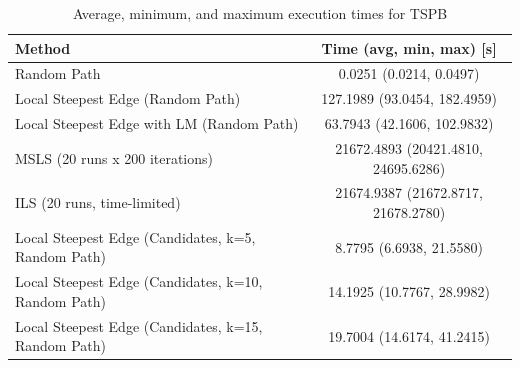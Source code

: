\begin{table}[h!]
\centering
\begin{tabular}{lc}
\hline
Method & Time (avg, min, max) [s] \\
\hline
Random Path & 0.0251 (0.0214, 0.0497) \\
Local Steepest Edge (Random Path) & 127.1989 (93.0454, 182.4959) \\
Local Steepest Edge with LM (Random Path) & 63.7943 (42.1606, 102.9832) \\
MSLS (20 runs x 200 iterations) & 21672.4893 (20421.4810, 24695.6286) \\
ILS (20 runs, time-limited) & 21674.9387 (21672.8717, 21678.2780) \\
Local Steepest Edge (Candidates, k=5, Random Path) & 8.7795 (6.6938, 21.5580) \\
Local Steepest Edge (Candidates, k=10, Random Path) & 14.1925 (10.7767, 28.9982) \\
Local Steepest Edge (Candidates, k=15, Random Path) & 19.7004 (14.6174, 41.2415) \\
\hline
\end{tabular}
\caption{Average, minimum, and maximum execution times for TSPB}
\label{tab:TSPB_timings}
\end{table}
